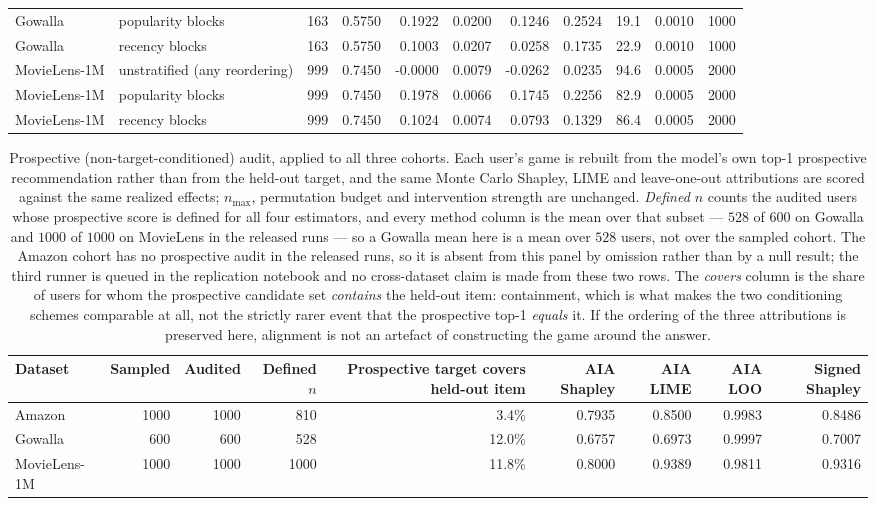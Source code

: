 \begin{table}[!htbp]
\begin{tabular}{@{}llrrrrrrrcr@{}}
Gowalla & popularity blocks & 163 & 0.5750 & 0.1922 & 0.0200 & 0.1246 & 0.2524 & 19.1 & 0.0010 & 1000 \\
Gowalla & recency blocks & 163 & 0.5750 & 0.1003 & 0.0207 & 0.0258 & 0.1735 & 22.9 & 0.0010 & 1000 \\
MovieLens-1M & unstratified (any reordering) & 999 & 0.7450 & -0.0000 & 0.0079 & -0.0262 & 0.0235 & 94.6 & 0.0005 & 2000 \\
MovieLens-1M & popularity blocks & 999 & 0.7450 & 0.1978 & 0.0066 & 0.1745 & 0.2256 & 82.9 & 0.0005 & 2000 \\
MovieLens-1M & recency blocks & 999 & 0.7450 & 0.1024 & 0.0074 & 0.0793 & 0.1329 & 86.4 & 0.0005 & 2000 \\
\bottomrule
\end{tabular}
\end{table}


\begin{table}[!htbp]\centering\scriptsize\setlength{\tabcolsep}{3pt}
\caption{Prospective (non-target-conditioned) audit, applied to all three cohorts. Each user's game is rebuilt from the model's own top-1 prospective recommendation rather than from the held-out target, and the same Monte Carlo Shapley, LIME and leave-one-out attributions are scored against the same realized effects; $n_{\max}$, permutation budget and intervention strength are unchanged. \emph{Defined $n$} counts the audited users whose prospective score is defined for all four estimators, and every method column is the mean over that subset --- $528$ of $600$ on Gowalla and $1000$ of $1000$ on MovieLens in the released runs --- so a Gowalla mean here is a mean over $528$ users, not over the sampled cohort. The Amazon cohort has no prospective audit in the released runs, so it is absent from this panel by omission rather than by a null result; the third runner is queued in the replication notebook and no cross-dataset claim is made from these two rows. The \emph{covers} column is the share of users for whom the prospective candidate set \emph{contains} the held-out item: containment, which is what makes the two conditioning schemes comparable at all, not the strictly rarer event that the prospective top-1 \emph{equals} it. If the ordering of the three attributions is preserved here, alignment is not an artefact of constructing the game around the answer.}
\label{tab:r9-prospective-replication}
\begin{tabular}{@{}lrrrrrrrr@{}}
\toprule
Dataset & Sampled & Audited & Defined $n$ & Prospective target covers held-out item & AIA Shapley & AIA LIME & AIA LOO & Signed Shapley \\
\midrule
Amazon & 1000 & 1000 & 810 & 3.4\% & 0.7935 & 0.8500 & 0.9983 & 0.8486 \\
Gowalla & 600 & 600 & 528 & 12.0\% & 0.6757 & 0.6973 & 0.9997 & 0.7007 \\
MovieLens-1M & 1000 & 1000 & 1000 & 11.8\% & 0.8000 & 0.9389 & 0.9811 & 0.9316 \\
\bottomrule
\end{tabular}
\end{table}


